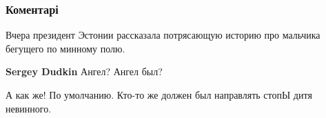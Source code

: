  
 
 
 
 
\subsubsection{Коментарі}
\label{sec:24_08_2021.fb.lukjanenko_sergej.pisatel.1.dusheschipatelnyje_istorii.cmt}

\begin{itemize}
 
Вчера президент Эстонии рассказала потрясающую историю про мальчика бегущего по минному полю.

\begin{itemize}
 
\textbf{Sergey Dudkin} Ангел? Ангел был? \Smiley[1.0][yellow]

 
А как же! По умолчанию. Кто-то же должен был направлять стопЫ дитя невинного.
\end{itemize}

 
🤝👏👏👏👏👏

 

\end{itemize}
